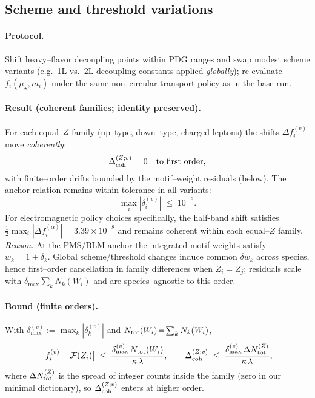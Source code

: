 \documentclass[epjc3]{svjour3}
\begin{document}
\subsection{Scheme and threshold variations}\label{sec:robust-scheme}

\paragraph{Protocol.} Shift heavy–flavor decoupling points within PDG ranges and swap modest scheme variants (e.g.\ 1L vs.\ 2L decoupling constants applied \emph{globally}); re-evaluate $f_i(\mu_\star,m_i)$ under the same non–circular transport policy as in the base run.

\paragraph{Result (coherent families; identity preserved).} For each equal–$Z$ family (up–type, down–type, charged leptons) the shifts $\Delta f_i^{(v)}$ move \emph{coherently}:
\[
\Delta_{\rm coh}^{(Z;v)} = 0 \quad\text{to first order,}
\]
with finite–order drifts bounded by the motif–weight residuals (below). The anchor relation remains within tolerance in all variants:
\[
\max_i|\delta_i^{(v)}| \;\le\; 10^{-6}.
\]
For electromagnetic policy choices specifically, the half-band shift satisfies $\tfrac{1}{2}\max_i|\Delta f_i^{(\alpha)}| = 3.39\times 10^{-8}$ and remains coherent within each equal–$Z$ family.
\emph{Reason.} At the PMS/BLM anchor the integrated motif weights satisfy $w_k=1+\delta_k$. Global scheme/threshold changes induce common $\delta w_k$ across species, hence first–order cancellation in family differences when $Z_i=Z_j$; residuals scale with $\delta_{\max}\!\sum_k N_k(W_i)$ and are species–agnostic to this order.%

\paragraph{Bound (finite orders).} With $\delta_{\max}^{(v)}\!:=\!\max_k|\delta_k^{(v)}|$ and $N_{\rm tot}(W_i)\!=\!\sum_k N_k(W_i)$,
\[
\bigl|f_i^{(v)}-\mathcal F(Z_i)\bigr|
\;\le\;
\frac{\delta_{\max}^{(v)}\,N_{\rm tot}(W_i)}{\kappa\,\lambda},
\qquad
\Delta_{\rm coh}^{(Z;v)}
\;\le\;
\frac{\delta_{\max}^{(v)}\,\Delta N_{\rm tot}^{(Z)}}{\kappa\,\lambda},
\]
where $\Delta N_{\rm tot}^{(Z)}$ is the spread of integer counts inside the family (zero in our minimal dictionary), so $\Delta_{\rm coh}^{(Z;v)}$ enters at higher order.%
\end{document}
